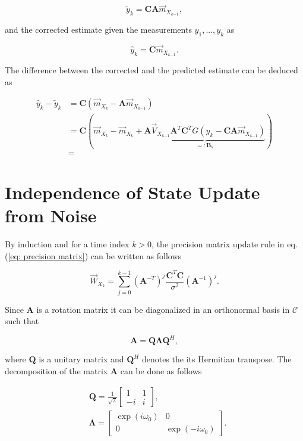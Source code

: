 \documentclass[11pt,a4paper,twoside]{report}
\newcommand{\messF}[3]{\overrightarrow{#1}_{{#2}_{k{#3}}}}
\newcommand{\mat}[1]{\mathbf{#1}}
\begin{document}
\begin{equation*}
	\tilde{y}_k = \mat{CA}\messF{m}{X}{-1},
\end{equation*}

and the corrected estimate given the measurements ${y_1,...,y_k}$ as

\begin{equation*}
	\hat{y}_k = \mat{C}\messF{m}{X}{-1}.
\end{equation*}

The difference between the corrected and the predicted estimate can be deduced as

\begin{align}
	\label{eq: }
	\hat{y}_k - \tilde{y}_k &= \mat{C}\left(\messF{m}{X}{} - \mat{A}\messF{m}{X}{-1}\right) \\
	&= \mat{C}\left(\messF{m}{X}{} - \messF{m}{X}{} + \underbrace{\mat{A}\messF{V}{X}{-1}\mat{A}^T\mat{C}^TG\left(y_k-\mat{CA}\messF{m}{X}{-1}\right)}_{=:\mat{B}_k}\right) \\
	&= 
\end{align}


\chapter*{Independence of State Update from Noise}
By induction and for a time index $k>0$, the precision matrix update rule in eq. (\ref{eq: precision matrix}) can be written as follows

\begin{equation}
	\label{eq: update rule}
	\messF{W}{X}{} = \sum_{j=0}^{k-1}\left(\mat{A}^{-T}\right)^j\frac{\mat{C}^T\mat{C}}{\sigma^2}\left(\mat{A}^{-1}\right)^{j}.
\end{equation}

Since $\mat{A}$ is a rotation matrix it can be diagonalized in an orthonormal basis in $\mathcal{C}$ such that

\begin{equation}
	\mat{A} = \mat{Q\Lambda}\mat{Q}^H,
\end{equation}

where $\mat{Q}$ is a unitary matrix and $\mat{Q}^H$ denotes the its Hermitian transpose. The decomposition of the matrix $\mat{A}$ can be done as follows

\begin{align*}
	&\mat{Q} = \frac{1}{\sqrt{2}}
		\begin{bmatrix}
			1 & 1 \\
			-i & i
		\end{bmatrix},
	\\
	&\mat{\Lambda} = 
		\begin{bmatrix}
			\exp{(i\omega_0)} & 0 \\
			0 & \exp{(-i\omega_0)}
		\end{bmatrix}.
\end{align*}
\end{document}
